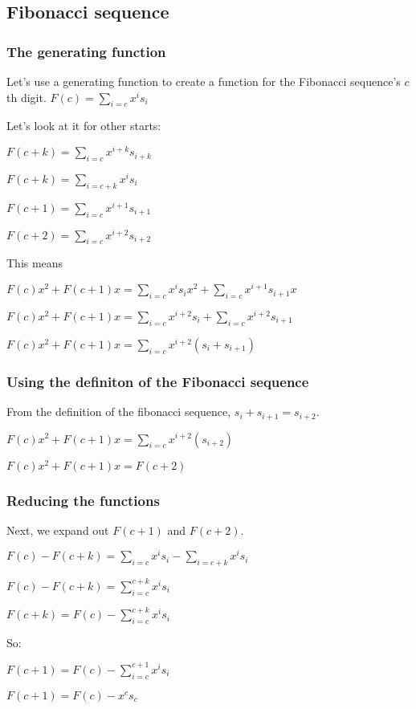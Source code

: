\subsection{Fibonacci sequence}

\subsubsection{The generating function}

Let's use a generating function to create a function for the Fibonacci sequence's \(c\)th digit.
$F(c)=\sum_{i=c} x^is_i$

Let's look at it for other starts:

$F(c+k)=\sum_{i=c} x^{i+k}s_{i+k}$

$F(c+k)=\sum_{i=c+k} x^is_i$

$F(c+1)=\sum_{i=c} x^{i+1}s_{i+1}$

$F(c+2)=\sum_{i=c} x^{i+2}s_{i+2}$

This means

$F(c)x^2+F(c+1)x=\sum_{i=c} x^i s_i x^2 +\sum_{i=c} x^{i+1} s_{i+1} x$

$F(c)x^2+F(c+1)x=\sum_{i=c} x^{i+2}s_i+\sum_{i=c} x^{i+2}s_{i+1}$

$F(c)x^2+F(c+1)x=\sum_{i=c} x^{i+2}(s_i+s_{i+1})$
\subsubsection{Using the definiton of the Fibonacci sequence}

From the definition of the fibonacci sequence, \(s_{i}+s_{i+1}=s_{i+2}\).

$F(c)x^2+F(c+1)x=\sum_{i=c} x^{i+2}(s_{i+2})$

$F(c)x^2+F(c+1)x=F(c+2)$

\subsubsection{Reducing the functions}

Next, we expand out \(F(c+1)\) and \(F(c+2)\).

$F(c)-F(c+k)=\sum_{i=c} x^i s_i -\sum_{i=c+k} x^i s_i$

$F(c)-F(c+k)=\sum^{c+k}_{i=c} x^i s_i$

$F(c+k)=F(c)-\sum^{c+k}_{i=c} x^i s_i$

So:

$F(c+1)=F(c)-\sum^{c+1}_{i=c} x^i s_i$

$F(c+1)=F(c)-x^c s_c$

